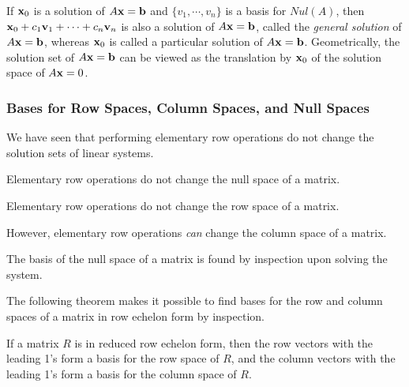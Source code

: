 \documentclass[12pt,letterpaper,reqno]{article}
\numberwithin{equation}{section}
\newcommand{\ti}[1]{\textit{#1}}
\newcommand{\fixme}[1]{{\color{orange}{[#1]}}}
\begin{document}
If ${\bf x}_0$ is a solution of $A{\bf x}={\bf b}$ and $\{v_1,\cdots,v_n\}$ is a basis for $Nul(A)$, then ${\bf x}_0+c_1{\bf v}_1+\cdots +c_n{\bf v}_n$ is also a solution of  $A{\bf x}={\bf b}$, called the \ti{general solution} of $A{\bf x}={\bf b}$, whereas ${\bf x}_0$ is called a particular solution of $A{\bf x}={\bf b}$. Geometrically, the solution set of $A{\bf x}={\bf b}$ can be viewed as the translation by ${\bf x}_0$ of the solution space of $A{\bf x}=0$.

\begin{example}
\fixme{See example 3 on page 423 of Anton.}	
\end{example}

\subsubsection{Bases for Row Spaces, Column Spaces, and Null Spaces}
We have seen that performing elementary row operations do not change the solution sets of linear systems.

\begin{thm}
	Elementary row operations do not change the null space of a matrix.
\end{thm}

\begin{thm}
	Elementary row operations do not change the row space of a matrix.
\end{thm}

However, elementary row operations \ti{can} change the column space of a matrix.

\begin{example}
\fixme{Anton, page 424.}	
\end{example}

The basis of the null space of a matrix is found by inspection upon solving the system. \fixme{Example 4 page 424 in Anton.}

The following theorem makes it possible to find bases for the row and column spaces of a matrix in row echelon form by inspection.

\begin{thm}
	If a matrix $R$ is in reduced row echelon form, then the row vectors with the leading 1's form a basis for the row space of $R$, and the column vectors with the leading 1's form a basis for the column space of $R$.
\end{thm}
\end{document}
